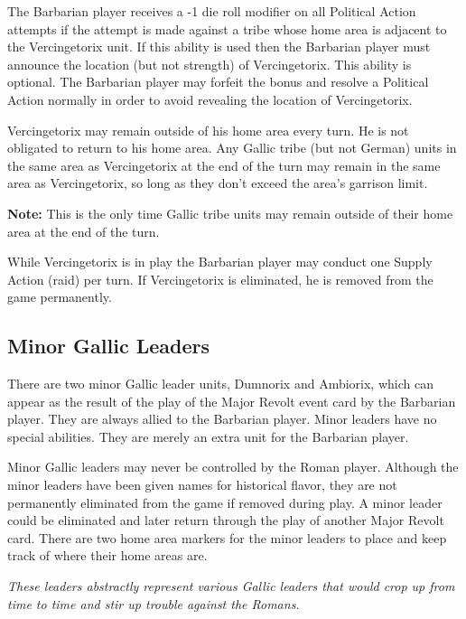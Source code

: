 The Barbarian player receives a -1 die roll modifier on all Political Action attempts if the attempt is made against a tribe whose home area is adjacent to the Vercingetorix unit. If this ability is used then the Barbarian player must announce the location (but not strength) of Vercingetorix. This ability is optional. The Barbarian player may forfeit the bonus and resolve a Political Action normally in order to avoid revealing the location of Vercingetorix.

Vercingetorix may remain outside of his home area every turn. He is not obligated to return to his home area. Any Gallic tribe (but not German) units in the same area as Vercingetorix at the end of the turn may remain in the same area as Vercingetorix, so long as they don’t exceed the area’s garrison limit.

\textbf{Note:} This is the only time Gallic tribe units may remain outside of their home area at the end of the turn.

While Vercingetorix is in play the Barbarian player may conduct one Supply Action (raid) per turn. If Vercingetorix is eliminated, he is removed from the game permanently.

\subsection{Minor Gallic Leaders}
\par
There are two minor Gallic leader units, Dumnorix and Ambiorix, which can appear as the result of the play of the Major Revolt event card by the Barbarian player. They are always allied to the Barbarian player. Minor leaders have no special abilities. They are merely an extra unit for the Barbarian player.

Minor Gallic leaders may never be controlled by the Roman player. Although the minor leaders have been given names for historical flavor, they are not permanently eliminated from the game if removed during play. A minor leader could be eliminated and later return through the play of another Major Revolt card. There are two home area markers for the minor leaders to place and keep track of where their home areas are.

\textit{These leaders abstractly represent various Gallic leaders that would crop up from time to time and stir up trouble against the Romans.}
